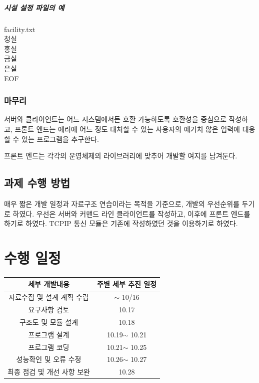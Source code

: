 \documentclass[12pt,a4paper]{report}
\begin{document}
\paragraph{시설 설정 파일의 예}facility.txt\\
청실\\홍실\\금실\\은실\\EOF

\subsection{마무리}
서버와 클라이언트는 어느 시스템에서든 호환 가능하도록 호환성을 중심으로 작성하고, 프론트 엔드는 에러에 어느 정도 대처할 수 있는 사용자의 예기치 않은 입력에 대응할 수 있는 프로그램을 추구한다.

프론트 엔드는 각각의 운영체제의 라이브러리에 맞추어 개발할 여지를 남겨둔다.
\section{과제 수행 방법}
매우 짧은 개발 일정과 자료구조 연습이라는 목적을 기준으로, 개발의 우선순위를 두기로 하였다.
우선은 서버와 커맨드 라인 클라이언트를 작성하고, 이후에 프론트 엔드를 하기로 하였다. 
TCPIP 통신 모듈은 기존에 작성하였던 것을 이용하기로 하였다. 
\chapter{수행 일정}
\begin{tabular}{|c|c|}
	\hline
세부 개발내용&주별 세부 추진 일정\\
\hline
자료수집 및 설계 계획 수립&$\sim$ 10/16\\
요구사항 검토&10.17\\
구조도 및 모듈 설계&10.18\\
프로그램 설계&10.19$\sim$ 10.21\\
프로그램 코딩&10.21$\sim$ 10.25\\
성능확인 및 오류 수정&10.26$\sim$ 10.27\\
최종 점검 및 개선 사항 보완&10.28\\
\hline
\end{tabular}
\end{document}
